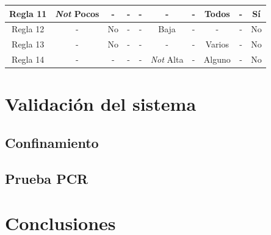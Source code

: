\documentclass[12pt,a4paper, xcolor=table]{article}
\begin{document}
\begin{center}
\begin{adjustwidth}{-1.3cm}{}
\begin{tabular}{c|c|c|c|c|c|c|c|c|c|}
\multicolumn{1}{|c|}{Regla 11} & \textit{Not} Pocos & - & - & - & - & - & Todos & - & Sí \\ \hline
\multicolumn{1}{|c|}{Regla 12} & - & No & - & - & Baja & - & - & - & No \\ \hline
\multicolumn{1}{|c|}{Regla 13} & - & No & - & - & - & - & Varios & - & No \\ \hline
\multicolumn{1}{|c|}{Regla 14} & - & - & - & - & \textit{Not} Alta & - & Alguno & - & No \\ \hline
\end{tabular}
\end{adjustwidth}
\end{center}





\section{Validación del sistema}

  \subsection{Confinamiento}

  \subsection{Prueba PCR}



\section{Conclusiones}

\clearpage




\end{document}
